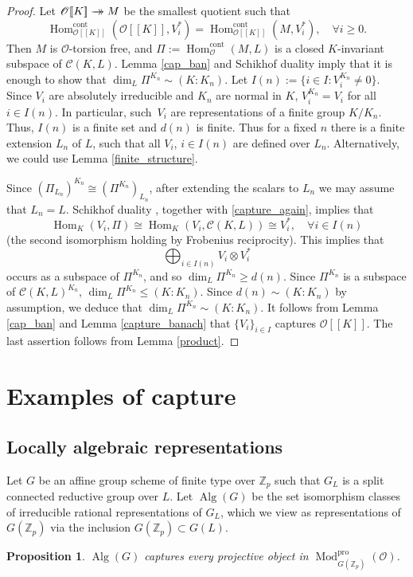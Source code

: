 \documentclass[JEP,XML,SOM,Unicode,NoEqCountersInSection]{cedram}
\let\mathcal\mathscr
\newcommand{\onto}{\mathchoice{\to\hspace*{-5mm}\to}{\to\hspace*{-2.85mm}\to}{\to\hspace*{-3mm}\to}{\to\hspace*{-3mm}\to}}
\newtheorem{prop}{Proposition}[section]
\theoremstyle{definition}
\DeclareMathOperator{\Hom}{Hom}
\DeclareMathOperator{\Mod}{Mod}
\DeclareMathOperator{\Alg}{Alg}
\newcommand{\br}[1]{[\![#1]\!]}
\newcommand{\Zp}{\mathbb{Z}_p}
\newcommand{\cO}{\mathcal{O}}
\newcommand{\pro}{\mathrm{pro}}
\newcommand{\cont}{\mathrm{cont}}
\begin{document}
\begin{proof} Let $\cO\br{K}\onto M$ be the smallest quotient such that
\begin{equation}\label{capture_again}
\Hom^{\cont}_{\cO\br{K}}(\cO\br{K}, V_i^*)=\Hom^{\cont}_{\cO\br{K}}(M, V_i^*),\quad \forall i\ge 0.
\end{equation}
Then $M$ is $\cO$-torsion free, and $\Pi:=\Hom_{\cO}^{\cont}(M, L)$ is a closed $K$-invariant subspace of $\mathcal C(K, L)$. Lemma \ref{cap_ban} and Schikhof duality imply that it is enough
to show that $\dim_L \Pi^{K_n}\sim (K:K_n)$. Let $I(n):=\{i\in I: V_i^{K_n}\neq 0\}$.
Since $V_i$ are absolutely irreducible and $K_n$ are normal in $K$, $V_i^{K_n}=V_i$ for all $i\in I(n)$. In particular, such~$V_i$ are representations of a finite group $K/K_n$. Thus, $I(n)$ is a finite set and $d(n)$ is finite.
Thus for a fixed $n$ there is a finite extension $L_n$ of $L$, such that all $V_i$, $i\in I(n)$ are defined over $L_n$. Alternatively, we could use Lemma \ref{finite_structure}.

Since $(\Pi_{L_n})^{K_n}\cong (\Pi^{K_n})_{L_n}$,
after extending the scalars to $L_n$ we may assume that $L_n=L$.
Schikhof duality \cite[Th.\,3.5]{iw}, together with \eqref{capture_again},
implies that
\begin{equation}
\Hom_K(V_i, \Pi)\cong \Hom_K(V_i, \mathcal{C}(K, L)) \cong V_i^*, \quad \forall i\in I(n)
\end{equation}
(the second isomorphism holding by Frobenius reciprocity).
This implies that
\[
\bigoplus_{i\in I(n)} V_i\otimes V_i^*
\]
occurs as a subspace of $\Pi^{K_n}$, and so $\dim_L \Pi^{K_n}\ge d(n)$. Since $\Pi^{K_n}$ is a subspace of
$\mathcal C(K, L)^{K_n}$, $\dim_L \Pi^{K_n} \le (K:K_n)$. Since $d(n)\sim (K:K_n)$ by assumption, we deduce that $\dim_L \Pi^{K_n}\sim (K: K_n)$.
It follows from Lemma \ref{cap_ban} and Lemma \ref{capture_banach} that $\{V_i\}_{i\in I}$ captures $\cO\br{K}$. The last assertion follows from Lemma \ref{product}.
\end{proof}

\section{Examples of capture}\label{examples}

\subsection{Locally algebraic representations}
Let $G$ be an affine group scheme of finite type over $\Zp$ such that $G_L$ is a split connected reductive group over $L$. Let
$\Alg(G)$ be the set isomorphism classes of irreducible rational representations of $G_L$, which we view as representations of $G(\Zp)$ via the inclusion $G(\Zp)\subset G(L)$.
\begin{prop}\label{capture_algebraic} $\Alg(G)$ captures every projective object in $\Mod^{\pro}_{G(\Zp)}(\cO)$.
\end{prop}
\end{document}
